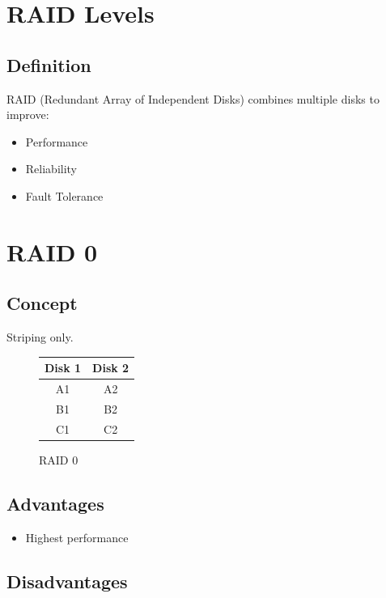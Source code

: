 \section{RAID Levels}

\subsection{Definition}

RAID (Redundant Array of Independent Disks) combines multiple disks to improve:

\begin{itemize}
\item Performance
\item Reliability
\item Fault Tolerance
\end{itemize}

\section{RAID 0}

\subsection{Concept}

Striping only.

\begin{figure}[h]
\centering
\begin{tabular}{|c|c|}
\hline
Disk 1 & Disk 2 \\
\hline
A1 & A2 \\
B1 & B2 \\
C1 & C2 \\
\hline
\end{tabular}
\caption{RAID 0}
\end{figure}

\subsection{Advantages}

\begin{itemize}
\item Highest performance
\end{itemize}

\subsection{Disadvantages}

